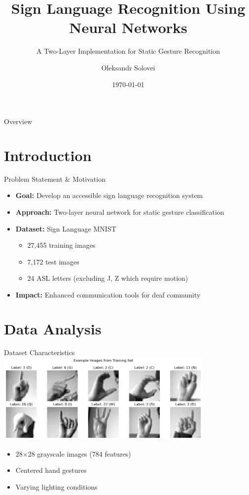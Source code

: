 \documentclass{beamer}
\title{Sign Language Recognition Using Neural Networks}
\subtitle{A Two-Layer Implementation for Static Gesture Recognition}
\author{Oleksandr Solovei}
\institute{Universidade de Aveiro}
\date{\today}
\begin{document}
\begin{frame}
    \titlepage
\end{frame}

\begin{frame}{Overview}
    \tableofcontents
\end{frame}

\section{Introduction}

\begin{frame}{Problem Statement \& Motivation}
    \begin{itemize}
        \item \textbf{Goal:} Develop an accessible sign language recognition system
        \item \textbf{Approach:} Two-layer neural network for static gesture classification
        \item \textbf{Dataset:} Sign Language MNIST
        \begin{itemize}
            \item 27,455 training images
            \item 7,172 test images
            \item 24 ASL letters (excluding J, Z which require motion)
        \end{itemize}
        \item \textbf{Impact:} Enhanced communication tools for deaf community
    \end{itemize}
\end{frame}

\section{Data Analysis}

\begin{frame}{Dataset Characteristics}
    \centering
    \includegraphics[width=0.8\textwidth]{dataset_sample.png}
    \begin{itemize}
        \begin{itemize}
            \item 28×28 grayscale images (784 features)
            \item Centered hand gestures
            \item Varying lighting conditions
        \end{itemize}
    \end{itemize}
\end{frame}
\end{document}
